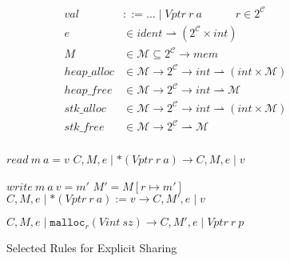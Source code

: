 \documentclass{article}
\begin{document}
\begin{figure}

  \begin{minipage}{0.45\textwidth}
    \[\begin{aligned}
    \mathit{val} & ::= \ldots \mid \mathit{Vptr} ~ r ~ a \hspace{3em} r \in 2^{\mathcal{C}} \\
    e & \in \mathit{ident} \rightharpoonup (2^{\mathcal{C}} \times \mathit{int}) \\
    M & \in \mathcal{M} \subseteq 2^{\mathcal{C}} \rightarrow \mathit{mem} \\
    \mathit{heap\_alloc} & \in \mathcal{M} \rightarrow 2^{\mathcal{C}} \rightarrow
    \mathit{int} \rightharpoonup (\mathit{int} \times \mathcal{M}) \\
    \mathit{heap\_free} & \in \mathcal{M} \rightarrow 2^{\mathcal{C}} \rightarrow
    \mathit{int} \rightharpoonup \mathcal{M} \\
    \mathit{stk\_alloc} & \in \mathcal{M} \rightarrow 2^{\mathcal{C}} \rightarrow
    \mathit{int} \rightharpoonup (\mathit{int} \times \mathcal{M}) \\
    \mathit{stk\_free} & \in \mathcal{M} \rightarrow 2^{\mathcal{C}}
    \rightharpoonup \mathcal{M} \\
    \end{aligned}\]
  \end{minipage}
  \begin{minipage}{0.55\textwidth}
                {\(\mathit{read} ~ m ~ a = v\)}
                {\(C,M,e \mid *(\mathit{Vptr} ~ r ~ a)
                  \longrightarrow C,M,e \mid v\)}

                  {\(\mathit{write} ~ m ~ a ~ v = m'\)}
                  {\(M' = M[r \mapsto m']\)}
                  {\(C,M,e \mid *(\mathit{Vptr} ~ r ~ a) := v
                    \longrightarrow C,M',e \mid v\)}

             {\(C,M,e \mid \mathtt{malloc}_r(\mathit{Vint} ~ sz)
               \longrightarrow C,M',e \mid \mathit{Vptr} ~ r ~ p\)}

  \end{minipage}

  \caption{Selected Rules for Explicit Sharing}
  \label{fig:powerset}
\end{figure}

  
  
\end{document}
